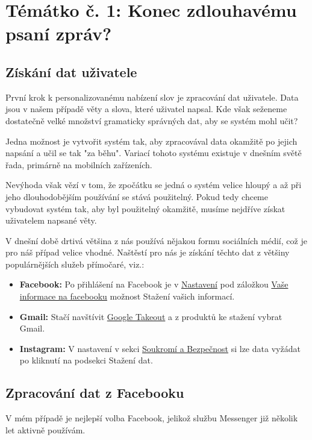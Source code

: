 \documentclass[a4paper, 12pt]{article}
\begin{document}
  \section{Témátko č. 1: Konec zdlouhavému psaní zpráv?}

  \subsection{Získání dat uživatele}
  První krok k personalizovanému nabízení slov je zpracování dat uživatele. Data jsou v našem případě věty a slova, které uživatel napsal. Kde však seženeme dostatečně velké množství gramaticky správných dat, aby se systém mohl učit?

  Jedna možnost je vytvořit systém tak, aby zpracovával data okamžitě po jejich napsání a učil se tak "za běhu". Variací tohoto systému existuje v dnešním světě řada, primárně na mobilních zařízeních.

  Nevýhoda však vězí v tom, že zpočátku se jedná o systém velice hloupý a až při jeho dlouhodobějším používání se stává použitelný. Pokud tedy chceme vybudovat systém tak, aby byl použitelný okamžitě, musíme nejdříve získat uživatelem napsané věty.

  V dnešní době drtivá většina z nás používá nějakou formu sociálních médií, což je pro náš případ velice vhodné. Naštěstí pro nás je získání těchto dat z většiny populárnějších služeb přímočaré, viz.:
  \begin{itemize}
    \item \textbf{Facebook:} Po přihlášení na Facebook je v \href{https://www.facebook.com/settings?tab=your_facebook_information}{Nastavení} pod záložkou \href{https://www.facebook.com/settings?tab=your_facebook_information}{Vaše informace na facebooku} možnost Stažení vašich informací.
    \item \textbf{Gmail:} Stačí navštívit \href{https://takeout.google.com/}{Google Takeout} a z produktů ke stažení vybrat Gmail.
    \item \textbf{Instagram:} V nastavení v sekci \href{https://www.instagram.com/download/request/}{Soukromí a Bezpečnost} si lze data vyžádat po kliknutí na podsekci Stažení dat.
  \end{itemize}

  \subsection{Zpracování dat z Facebooku}
  V mém případě je nejlepší volba Facebook, jelikož službu Messenger již několik let aktivně používám.
\end{document}
